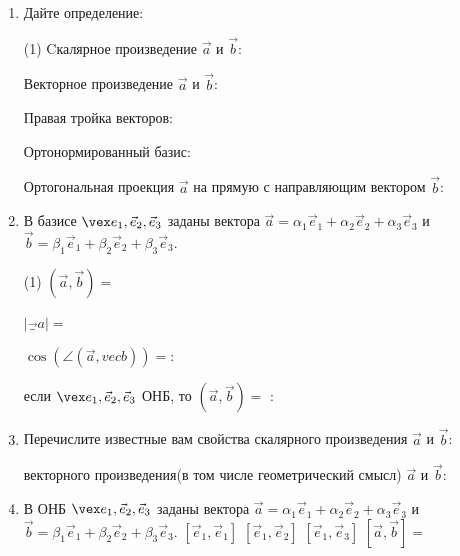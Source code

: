 \begin{enumerate}
	\item Дайте определение:
    \begin{tasks}(1)
        \task Cкалярное произведение $\vec a$ и $\vec b$:\ \hrulefill\par\hrulefill\par\hrulefill
        \task Векторное произведение $\vec a$ и $\vec b$:\ \hrulefill\par\hrulefill\par\hrulefill
        \task Правая тройка векторов:\ \hrulefill\par\hrulefill\par\hrulefill\par\hrulefill
        \task Ортонормированный базис:\ \hrulefill\par\hrulefill\par\hrulefill
        \task Ортогональная проекция $\vec a$ на прямую с направляющим вектором $\vec b$:\ \hrulefill\par\hrulefill\par\hrulefill
    \end{tasks}
    
    \item В базисе ${\vex e_1, \vec e_2, \vec e_3}$ заданы вектора $\vec a = \alpha_1 \vec e_1 + \alpha_2 \vec e_2 + \alpha_3 \vec e_3$ и $\vec b = \beta_1 \vec e_1 + \beta_2 \vec e_2 + \beta_3 \vec e_3$.
    \begin{tasks}(1)
        \task $(\vec a, \vec b)= $ \ \hrulefill\par\hrulefill\par\hrulefill
        \task $|\vec_a|=$ \ \hrulefill\par\hrulefill\par\hrulefill
        \task $\cos(\angle (\vec a, vec b))=$:\ \hrulefill\par\hrulefill\par\hrulefill\par\hrulefill
        \task если ${\vex e_1, \vec e_2, \vec e_3}$ ОНБ, то $(\vec a, \vec b)=$ :\ \hrulefill\par\hrulefill\par\hrulefill
    \end{tasks}
    
    \item Перечислите известные вам свойства
    	\task скалярного произведения $\vec a$ и $\vec b$:\ \hrulefill\par\hrulefill\par\hrulefill
        \task векторного произведения(в том числе геометрический смысл) $\vec a$ и $\vec b$:\ \hrulefill\par\hrulefill\par\hrulefill
    
    \item В ОНБ ${\vex e_1, \vec e_2, \vec e_3}$ заданы вектора $\vec a = \alpha_1 \vec e_1 + \alpha_2 \vec e_2 + \alpha_3 \vec e_3$ и $\vec b = \beta_1 \vec e_1 + \beta_2 \vec e_2 + \beta_3 \vec e_3$.
    	\task $[\vec e_1, \vec e_1]$  \hspace{28} $[\vec e_1, \vec e_2]$ \hspace{28} $[\vec e_1, \vec e_3]$ 
   		 \task $[\vec a, \vec b]=$ 
\end{enumerate}